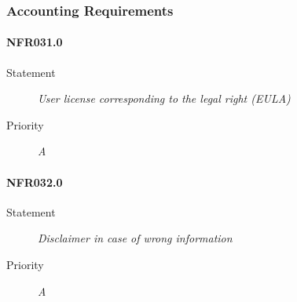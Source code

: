 \subsubsection{Accounting Requirements}

\paragraph{NFR031.0}
\begin{description}
\item[Statement] \textit{
User license corresponding to the legal right (\gls{EULA})
}
\item[Priority] \textit{A}
\end{description}

\paragraph{NFR032.0}
\begin{description}
\item[Statement] \textit{
Disclaimer in case of wrong information
}
\item[Priority] \textit{A}
\end{description}